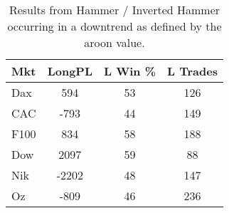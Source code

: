 \begin{table}[ht]
\centering
\caption[Hammer System in downtrend.]{Results from Hammer / Inverted Hammer occurring in a downtrend as defined by the aroon value.} 
\label{tab:hammer_aroon_results}
\begin{tabular}{lccc}
  \toprule Mkt & LongPL & L Win \% & L Trades \\ 
  \midrule Dax & 594 & 53 & 126 \\ 
  CAC & -793 & 44 & 149 \\ 
  F100 & 834 & 58 & 188 \\ 
  Dow & 2097 & 59 & 88 \\ 
  Nik & -2202 & 48 & 147 \\ 
  Oz & -809 & 46 & 236 \\ 
   \bottomrule \end{tabular}
\end{table}
